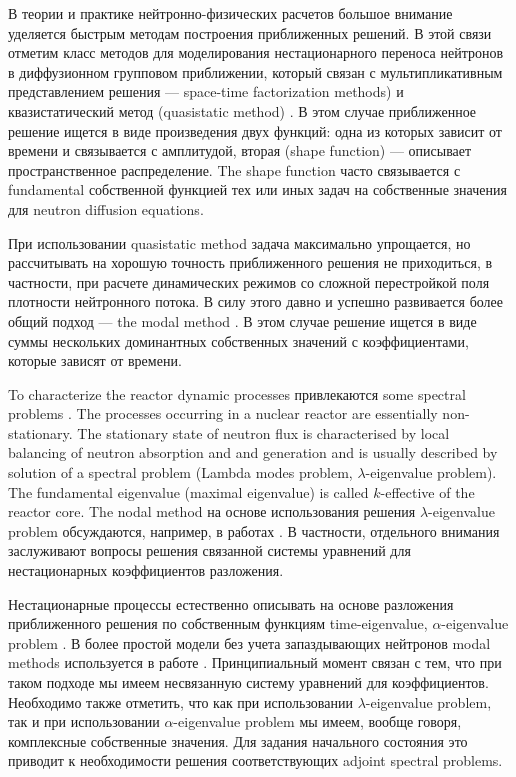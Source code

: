 \documentclass[authoryear]{elsarticle}
\begin{document}
В теории и практике нейтронно-физических расчетов большое внимание уделяется
быстрым методам построения приближенных решений. В этой связи отметим
класс методов для моделирования нестационарного 
переноса нейтронов в диффузионном групповом приближении,
который связан с мультипликативным представлением решения --- space-time factorization methods) и квазистатический метод 
(quasistatic method)  \citep{dodds1976accuracy,chou1990three,goluoglu2001time,dulla2008quasi,dahmani20013d}.
В этом случае приближенное решение ищется в виде произведения двух функций: одна из которых зависит от времени и связывается с амплитудой,
вторая (shape function) --- описывает пространственное распределение.  
The shape function часто связывается с fundamental собственной функцией тех или иных 
задач на собственные значения для  neutron diffusion equations.

При использовании quasistatic method задача максимально упрощается, но рассчитывать на хорошую точность приближенного решения
не приходиться, в частности, при расчете 
динамических режимов со сложной перестройкой поля плотности нейтронного потока.
В силу этого давно и успешно развивается более общий подход --- the modal method  \citep{stacey1967modal,stacey1969space,sutton1996diffusion}.
В этом случае решение ищется в виде суммы нескольких доминантных собственных значений с коэффициентами,
которые зависят от времени.

To characterize the reactor dynamic processes привлекаются some spectral
problems \citep{Bell1970,hetrick1971dynamics,stewart1976spectral,stacey}.
The processes occurring in a nuclear reactor are essentially non-stationary. 
The stationary state of neutron flux is characterised by local balancing of neutron absorption and and generation
and is usually described by solution of a spectral problem (Lambda modes problem, $\lambda$-eigenvalue problem).
The fundamental eigenvalue (maximal eigenvalue) is called $k$-effective of the reactor core.
The nodal method на основе использования решения $\lambda$-eigenvalue problem обсуждаются, например,
в работах \cite{verdu1998modal,miro2002nodal,gonzalez2009high}. В частности, отдельного внимания заслуживают вопросы решения
связанной системы уравнений для нестационарных коэффициентов разложения. 

Нестационарные процессы естественно описывать на основе разложения 
приближенного решения по собственным функциям 
time-eigenvalue, $\alpha$-eigenvalue problem \citep{ginestar2002transient,verdu20103d,verdu2014modal}.
В более простой модели без учета запаздывающих нейтронов modal methods
используется в работе \cite{modak2007scheme}.
Принципиальный момент связан с тем, что при таком подходе мы имеем несвязанную систему уравнений для коэффициентов.
Необходимо также отметить, что как при использовании  $\lambda$-eigenvalue problem, так и при использовании
$\alpha$-eigenvalue problem мы имеем, вообще говоря, комплексные собственные значения.
Для задания начального состояния это приводит к необходимости решения соответствующих adjoint spectral problems.
\end{document}
